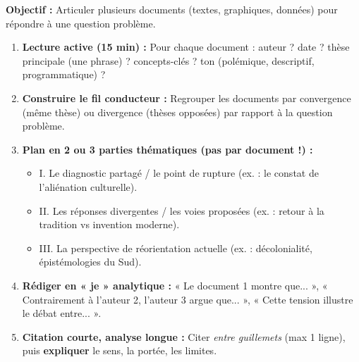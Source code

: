\documentclass[11pt]{article}
\newcommand{\cle}[1]{{\popxbold\color{popdark}#1}}
\begin{document}
\begin{methode}
\textbf{Objectif :} Articuler plusieurs documents (textes, graphiques, données) pour répondre à une question problème.
\begin{enumerate}
    \item \textbf{Lecture active (15 min) :} Pour chaque document : auteur ? date ? thèse principale (une phrase) ? concepts-clés ? ton (polémique, descriptif, programmatique) ?
    \item \textbf{Construire le fil conducteur :} Regrouper les documents par \cle{convergence} (même thèse) ou \cle{divergence} (thèses opposées) par rapport à la question problème.
    \item \textbf{Plan en 2 ou 3 parties thématiques (pas par document !) :}
        \begin{itemize}
            \item I. Le diagnostic partagé / le point de rupture (ex. : le constat de l'aliénation culturelle).
            \item II. Les réponses divergentes / les voies proposées (ex. : retour à la tradition vs invention moderne).
            \item III. La perspective de réorientation actuelle (ex. : décolonialité, épistémologies du Sud).
        \end{itemize}
    \item \textbf{Rédiger en « je » analytique :} « Le document 1 montre que... », « Contrairement à l'auteur 2, l'auteur 3 argue que... », « Cette tension illustre le débat entre... ».
    \item \textbf{Citation courte, analyse longue :} Citer \emph{entre guillemets} (max 1 ligne), puis \textbf{expliquer} le sens, la portée, les limites.
\end{enumerate}
\end{methode}
\end{document}
